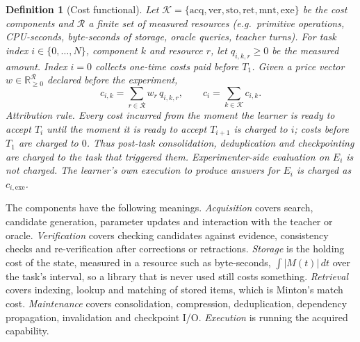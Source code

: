 \documentclass[11pt]{article}
\newtheorem{definition}{Definition}
\theoremstyle{remark}
\newcommand{\R}{\mathbb{R}}
\newcommand{\cK}{\mathcal{K}}
\newcommand{\cR}{\mathcal{R}}
\begin{document}
\begin{definition}[Cost functional]\label{def:cost}
Let $\cK = \{\mathrm{acq},\mathrm{ver},\mathrm{sto},\mathrm{ret},\mathrm{mnt},\mathrm{exe}\}$ be the cost components and $\cR$ a finite set of measured resources (e.g.\ primitive operations, CPU-seconds, byte-seconds of storage, oracle queries, teacher turns).
For task index $i\in\{0,\dots,N\}$, component $k$ and resource $r$, let $q_{i,k,r}\ge 0$ be the measured amount.
Index $i=0$ collects one-time costs paid before $T_1$.
Given a price vector $w\in\R_{\ge 0}^{\cR}$ \emph{declared before the experiment},
\begin{equation}\label{eq:cost}
c_{i,k} = \sum_{r\in\cR} w_r\, q_{i,k,r}, \qquad c_i = \sum_{k\in\cK} c_{i,k}.
\end{equation}
\emph{Attribution rule.} Every cost incurred from the moment the learner is ready to accept $T_i$ until the moment it is ready to accept $T_{i+1}$ is charged to $i$; costs before $T_1$ are charged to $0$.
Thus post-task consolidation, deduplication and checkpointing are charged to the task that triggered them.
Experimenter-side evaluation on $E_i$ is not charged.
The learner's own execution to produce answers for $E_i$ is charged as $c_{i,\mathrm{exe}}$.
\end{definition}

The components have the following meanings.
\emph{Acquisition} covers search, candidate generation, parameter updates and interaction with the teacher or oracle.
\emph{Verification} covers checking candidates against evidence, consistency checks and re-verification after corrections or retractions.
\emph{Storage} is the holding cost of the state, measured in a resource such as byte-seconds, $\int |M(t)|\,dt$ over the task's interval, so a library that is never used still costs something.
\emph{Retrieval} covers indexing, lookup and matching of stored items, which is Minton's match cost.
\emph{Maintenance} covers consolidation, compression, deduplication, dependency propagation, invalidation and checkpoint I/O.
\emph{Execution} is running the acquired capability.
\end{document}
